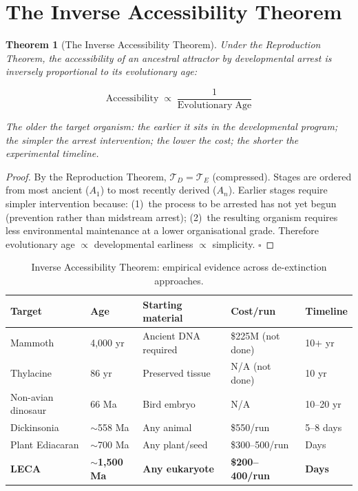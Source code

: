 \documentclass[12pt, a4paper]{article}
\newtheorem{theorem}{Theorem}[section]
\theoremstyle{definition}
\theoremstyle{remark}
\begin{document}
\section{The Inverse Accessibility Theorem}

\begin{theorem}[The Inverse Accessibility Theorem]
Under the Reproduction Theorem, the accessibility of an
ancestral attractor by developmental arrest is inversely
proportional to its evolutionary age:

\[
  \mathrm{Accessibility} \;\propto\;
  \frac{1}{\mathrm{Evolutionary\;Age}}
\]

The older the target organism: the earlier it sits in the
developmental program; the simpler the arrest intervention;
the lower the cost; the shorter the experimental timeline.
\end{theorem}

\begin{proof}
By the Reproduction Theorem, $\mathcal{T}_D =
\mathcal{T}_E$ (compressed). Stages are ordered from most
ancient ($A_1$) to most recently derived ($A_n$). Earlier
stages require simpler intervention because: (1)~the
process to be arrested has not yet begun (prevention rather
than midstream arrest); (2)~the resulting organism requires
less environmental maintenance at a lower organisational
grade. Therefore evolutionary age $\propto$ developmental
earliness $\propto$ simplicity. $\square$
\end{proof}

\begin{table}[H]
\centering
\caption{Inverse Accessibility Theorem: empirical evidence
across de-extinction approaches.}
\label{tab:inverse}
\begin{tabularx}{\textwidth}{lXXll}
\toprule
\textbf{Target} & \textbf{Age} &
\textbf{Starting material} &
\textbf{Cost/run} & \textbf{Timeline} \\
\midrule
Mammoth & 4,000 yr
  & Ancient DNA required
  & \$225M (not done) & 10$+$ yr \\
Thylacine & 86 yr
  & Preserved tissue
  & N/A (not done) & 10 yr \\
Non-avian dinosaur & 66 Ma
  & Bird embryo
  & N/A & 10--20 yr \\
Dickinsonia & $\sim$558 Ma
  & Any animal
  & \$550/run & 5--8 days \\
Plant Ediacaran & $\sim$700 Ma
  & Any plant/seed
  & \$300--500/run & Days \\
\textbf{LECA} & \textbf{$\sim$1,500 Ma}
  & \textbf{Any eukaryote}
  & \textbf{\$200--400/run} & \textbf{Days} \\
\bottomrule
\end{tabularx}
\end{table}
\end{document}
